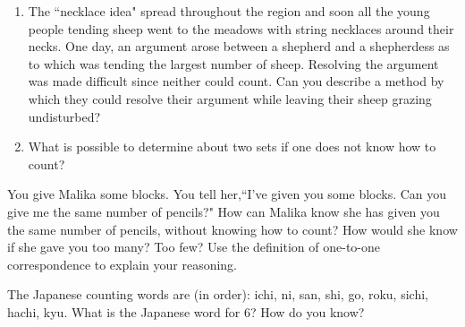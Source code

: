 \documentclass[handout]{ximera}
\begin{document}
\begin{problem}
\begin{enumerate}
\item \label{ShepherdsNecklaceC} 	The ``necklace idea" spread throughout the region and soon all the young people tending sheep went to the meadows with string necklaces around their necks. One day, an argument arose between a shepherd and a shepherdess as to which was tending the largest number of sheep. Resolving the argument was made difficult since neither could count. Can you describe a method by which they could resolve their argument while leaving their sheep grazing undisturbed?

\item 	What is possible to determine about two sets if one does not know how to count?

\vskip 0.5in
\end{enumerate}
\end{problem}
\begin{problem} 

You give Malika some blocks. You tell her,``I've given you some blocks. Can you give me the same number of pencils?" How can Malika know she has given you the same number of pencils, without knowing how to count? How would she know if she gave you too many? Too few? Use the definition of one-to-one correspondence to explain your reasoning.

\end{problem}

\begin{problem}
The Japanese counting words are (in order): ichi, ni, san, shi, go, roku, sichi, hachi, kyu. What is the Japanese word for 6? How do you know?

\end{problem}
\end{document}
